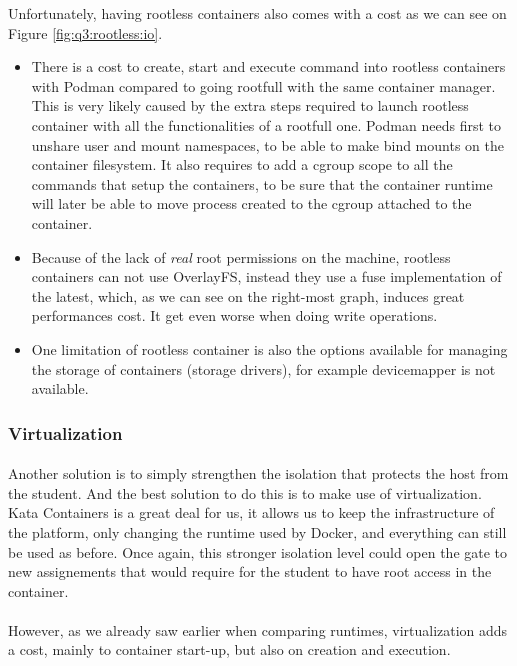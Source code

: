 Unfortunately, having rootless containers also comes with a cost as we can see on Figure \ref{fig:q3:rootless:io}.
\begin{itemize}
  \item There is a cost to create, start and execute command into rootless containers with Podman compared to going rootfull with the same container manager.  This is very likely caused by the extra steps required to launch rootless container with all the functionalities of a rootfull one.  Podman needs first to unshare user and mount namespaces, to be able to make bind mounts on the container filesystem.  It also requires to add a cgroup scope to all the commands that setup the containers, to be sure that the container runtime will later be able to move process created to the cgroup attached to the container.
  \item Because of the lack of \textit{real} root permissions on the machine, rootless containers can not use OverlayFS, instead they use a fuse implementation of the latest, which, as we can see on the right-most graph, induces great performances cost.  It get even worse when doing write operations.
  \item One limitation of rootless container is also the options available for managing the storage of containers (storage drivers), for example devicemapper is not available.
\end{itemize}

\subsubsection{Virtualization}
\paragraph{}Another solution is to simply strengthen the isolation that protects the host from the student.  And the best solution to do this is to make use of virtualization.  Kata Containers is a great deal for us, it allows us to keep the infrastructure of the platform, only changing the runtime used by Docker, and everything can still be used as before.  Once again, this stronger isolation level could open the gate to new assignements that would require for the student to have root access in the container.

\paragraph{}However, as we already saw earlier when comparing runtimes, virtualization adds a cost, mainly to container start-up, but also on creation and execution.

